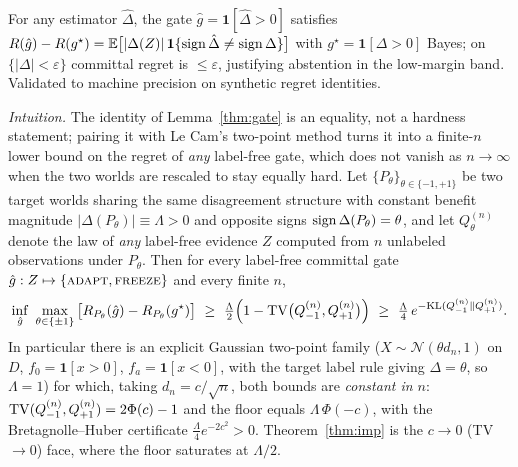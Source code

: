 \begin{lemma}\label{thm:gate}
For any estimator $\hat\Delta$, the gate $\hat g=\mathbf 1[\hat\Delta>0]$ satisfies
$R(\hat g)-R(g^\star)=\mathbb{E}\big[|\Delta(Z)|\,\mathbf 1\{\operatorname{sign}\hat\Delta\neq\operatorname{sign}\Delta\}\big]$
with $g^\star=\mathbf 1[\Delta>0]$ Bayes; on $\{|\Delta|<\varepsilon\}$ committal regret
is $\le\varepsilon$, justifying abstention in the low-margin band. Validated to machine precision on synthetic regret identities.
\end{lemma}

\begin{proposition}\label{prop:lecam-finite}\label{cor:lecam-regret-floor}
\emph{Intuition.} The identity of Lemma~\ref{thm:gate} is an equality, not a hardness
statement; pairing it with Le Cam's two-point method turns it into a finite-$n$ lower bound
on the regret of \emph{any} label-free gate, which does not vanish as $n\to\infty$ when the
two worlds are rescaled to stay equally hard.
Let $\{P_\theta\}_{\theta\in\{-1,+1\}}$ be two target worlds sharing the same disagreement
structure with constant benefit magnitude $|\Delta(P_\theta)|\equiv\Lambda>0$ and opposite
signs $\operatorname{sign}\Delta(P_\theta)=\theta$, and let $Q^{(n)}_\theta$ denote the law of \emph{any}
label-free evidence $Z$ computed from $n$ unlabeled observations under $P_\theta$. Then for
every label-free committal gate $\hat g:Z\mapsto\{\textsc{adapt},\textsc{freeze}\}$ and every
finite $n$,
\[
\inf_{\hat g}\ \max_{\theta\in\{\pm1\}}\big[R_{P_\theta}(\hat g)-R_{P_\theta}(g^\star)\big]
\ \ge\ \tfrac{\Lambda}{2}\Big(1-\TV\big(Q^{(n)}_{-1},Q^{(n)}_{+1}\big)\Big)
\ \ge\ \tfrac{\Lambda}{4}\,e^{-\mathrm{KL}(Q^{(n)}_{-1}\|Q^{(n)}_{+1})}.
\]
In particular there is an explicit Gaussian two-point family ($X\sim\mathcal N(\theta d_n,1)$ on
$D$, $f_0=\mathbf1[x>0]$, $f_a=\mathbf1[x<0]$, with the target label rule giving $\Delta=\theta$,
so $\Lambda=1$) for which, taking $d_n=c/\sqrt n$, both bounds are \emph{constant in $n$}:
$\mathrm{TV}(Q^{(n)}_{-1},Q^{(n)}_{+1})=2\Phi(c)-1$ and the floor equals $\Lambda\,\Phi(-c)$, with the
Bretagnolle--Huber certificate $\tfrac{\Lambda}{4}e^{-2c^2}>0$. Theorem~\ref{thm:imp} is the
$c\to0$ (TV${}\to0$) face, where the floor saturates at $\Lambda/2$.
\end{proposition}
